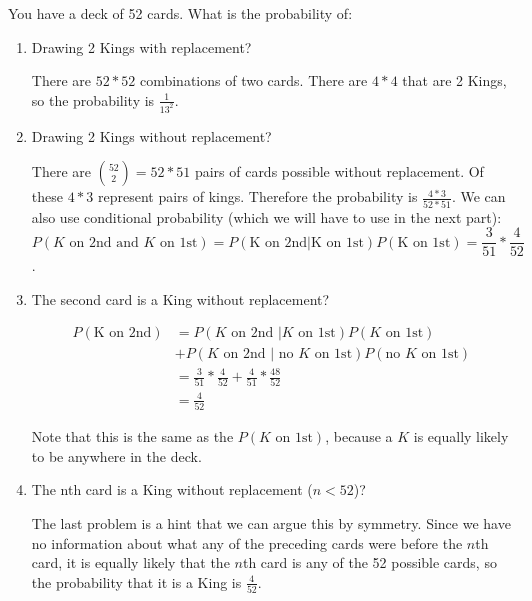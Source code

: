 \question You have a deck of 52 cards. What is the probability of:
\begin{enumerate}[label=(\alph*)]

\item Drawing 2 Kings with replacement?
\begin{solution}
There are $52*52$ combinations of two 
cards. There are $4*4$ that are 2 Kings, so the probability is 
$\frac{1}{13^2}$.
 \end{solution}
 
\item Drawing 2 Kings without replacement?
\begin{solution}
There are ${52 \choose 2} = 52*51$ pairs of cards possible without replacement. 
Of these $4*3$ represent pairs of kings. Therefore the 
probability is $\frac{4*3}{52*51}$.
We can also use conditional probability (which we will have to use in 
the next part):
\[P(K \text{ on 2nd and } K \text{ on 1st}) = P(\text{K on 2nd} | 
\text{K on 1st}) P(\text{K on 1st}) = \frac{3}{51}*\frac{4}{52}\].
 \end{solution}
 
\item The second card is a King without replacement?
\begin{solution}
\begin{equation}
\begin{split}
P(\text{K on 2nd}) &= P(K \text{ on 2nd }| K \text{ on 1st}) P(K \text{ on 1st}) \\
& + P(K \text{ on 2nd }| \text{ no $K$ on 1st}) P(\text{no $K$ on 1st}) \\
&= \frac{3}{51}*\frac{4}{52} + \frac{4}{51}*\frac{48}{52}  \\
&= \frac{4}{52}
\end{split}
\end{equation}

Note that this is the same as the $P(K\text{ on 1st})$, because a $K$ 
is equally likely to be anywhere in the deck.
 \end{solution}
 
\item The nth card is a King without replacement ($n < 52$)?
\begin{solution} [1 mm]
The last problem is a hint that we can argue this by symmetry. Since 
we have no information about what any of the preceding cards were 
before the $n$th card, it is equally likely that the $n$th card is any of the 52 
possible cards, so the probability that it is a King is 
$\frac{4}{52}$.
\end{solution}

\end{enumerate}